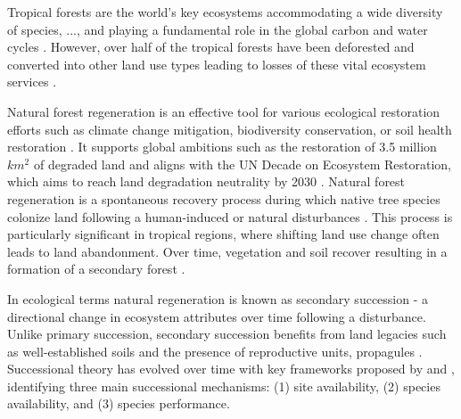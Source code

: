 Tropical forests are the world's key ecosystems accommodating a wide diversity of species, ..., and playing a fundamental role in the global carbon and water cycles \citep{bormaCarbonContributionsSouth2022}. However, over half of the tropical forests have been deforested and converted into other land use types leading to losses of these vital ecosystem services \citep{chazdonNaturalRegenerationTool2016}. 

Natural forest regeneration is an effective tool for various ecological restoration efforts such as climate change mitigation, biodiversity conservation, or soil health restoration \citep{hordijkLandUseHistory2024}. %
It supports global ambitions such as the restoration of 3.5 million $km^2$ of degraded land \citep{holl2017restoring} and aligns with the UN Decade on Ecosystem Restoration, which aims to reach land degradation neutrality by 2030 \citep{waltham2020decade}. Natural forest regeneration is a spontaneous recovery process during which native tree species colonize land following a human-induced or natural disturbances \citep{crouzeillesEcologicalRestorationSuccess2017}. This process is particularly significant in tropical regions, where shifting land use change often leads to land abandonment. Over time, vegetation and soil recover resulting in a formation of a secondary forest \citep{chazdonSecondGrowthPromise2014}.



In ecological terms natural regeneration is known as secondary succession - a directional change in ecosystem attributes over time following a disturbance. Unlike primary succession, secondary succession benefits from land legacies such as well-established soils and the presence of reproductive units, propagules \citep{poorterSuccessionalTheories2023}. %
Successional theory has evolved over time with 
key frameworks proposed by \citet{pickettHierarchicalConsiderationCauses1987} and \citet{poorterComprehensiveFrameworkVegetation2024}, identifying three main successional mechanisms: (1) site availability, (2) species availability, and (3) species performance. 

